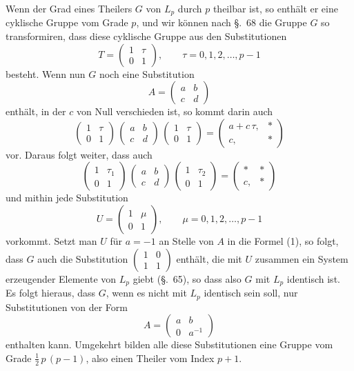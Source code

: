 \documentclass[12pt,a4paper]{article}
\begin{document}
Wenn der Grad eines Theilers $G$ von $L_{p}$ durch $p$ theilbar ist, so enthält er eine cyklische Gruppe vom Grade $p$, und wir können nach \S.~68 die Gruppe $G$ so transformiren, dass diese cyklische Gruppe aus den Substitutionen
\[
T = \begin{pmatrix}1&\tau\\0&1\end{pmatrix},\qquad
\tau = 0, 1, 2, \ldots, p-1
\]
besteht. Wenn nun $G$ noch eine Substitution
\[
A = \begin{pmatrix}a&b\\c&d\end{pmatrix}
\]
enthält, in der $c$ von Null verschieden ist, so kommt darin auch
\[
\begin{pmatrix}1&\tau\\0&1\end{pmatrix}\,
\begin{pmatrix}a&b\\c&d\end{pmatrix}\,
\begin{pmatrix}1&\tau\\0&1\end{pmatrix}
= \begin{pmatrix}a + c\,\tau,& *\\c,& *\end{pmatrix}
\]
vor. Daraus folgt weiter, dass auch
\[
\begin{pmatrix}1&\tau_{1}\\0&1\end{pmatrix}\,
\begin{pmatrix}a&b\\c&d\end{pmatrix}\,
\begin{pmatrix}1&\tau_{2}\\0&1\end{pmatrix}
= \begin{pmatrix}*& *\\c,& *\end{pmatrix}
\]
und mithin jede Substitution
\[
U = \begin{pmatrix}1&\mu\\0&1\end{pmatrix},\qquad
\mu = 0, 1, 2, \ldots, p-1
\]
vorkommt. Setzt man $U$ für $a = -1$ an Stelle von $A$ in die Formel (1), so folgt, dass $G$ auch die Substitution $\begin{pmatrix}1&0\\1&1\end{pmatrix}$ enthält, die mit $U$ zusammen ein System erzeugender Elemente von $L_{p}$ giebt (\S.~65), so dass also $G$ mit $L_{p}$ identisch ist. Es folgt hieraus, dass $G$, wenn es nicht mit $L_{p}$ identisch sein soll, nur Substitutionen von der Form
\[
A = \begin{pmatrix}a&b\\0&a^{-1}\end{pmatrix}
\]
enthalten kann. Umgekehrt bilden alle diese Substitutionen eine Gruppe vom Grade $\frac{1}{2}\,p\,(p-1)$, also einen Theiler vom Index $p+1$.
\end{document}
